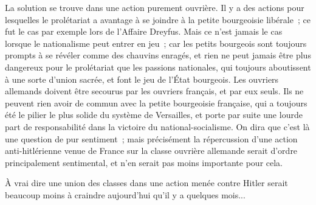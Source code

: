 \documentclass[french,twoside]{book} %
\begin{document}
La solution se trouve dans une action purement ouvrière. Il y a des actions pour lesquelles le prolétariat a avantage à se joindre à la petite bourgeoisie libérale ; ce fut le cas par exemple lors de l'Affaire Dreyfus. Mais ce n'est jamais le cas lorsque le nationalisme peut entrer en jeu ; car les petits bour­geois sont toujours prompts à se révéler comme des chauvins enragés, et rien ne peut jamais être plus dangereux pour le prolétariat que les passions nationales, qui toujours aboutissent à une sorte d'union sacrée, et font le jeu de l'État bourgeois. Les ouvriers allemands doivent être secourus par les ouvriers français, et par eux seuls. Ils ne peuvent rien avoir de commun avec la petite bourgeoisie française, qui a toujours été le pilier le plus solide du système de Versailles, et porte par suite une lourde part de responsabilité dans la victoire du national-socialisme. On dira que c'est là une question de pur sentiment ; mais précisément la répercussion d'une action anti-hitlérienne venue de France sur la classe ouvrière allemande serait d'ordre principalement sentimental, et n'en serait pas moins importante pour cela.\par
À vrai dire une union des classes dans une action menée contre Hitler serait beaucoup moins à craindre aujourd'hui qu'il y a quelques mois...\par
\end{document}
